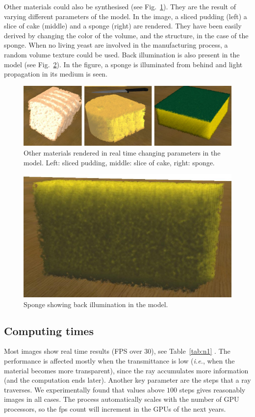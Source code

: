 \documentclass[oneside,a4paper,english,links]{amca}
\begin{document}
Other materials could also be synthesised (see
Fig.~\ref{fg:fig6}). They are the result of varying different
parameters of the model. In the image, a sliced pudding (left) a slice
of cake (middle) and a sponge (right) are rendered. They have been
easily derived by changing the color of the volume, and the structure,
in the case of the sponge. When no living yeast are involved in the
manufacturing process, a random volume texture could be used. Back
illumination is also present in the model (see Fig.~\ref{fg:fig7}). In
the figure, a sponge is illuminated from behind and light propagation
in its medium is seen.

\begin{figure}[htb!]
  \centerline{\includegraphics[scale=0.3]{fig6}}
  \caption{Other materials rendered in real time changing parameters in the model. Left: sliced pudding, middle: slice of cake, right: sponge. }
  \label{fg:fig6}
\end{figure}



\begin{figure}[htb!]
  \centerline{\includegraphics[scale=0.25]{fig7}}
  \caption{Sponge showing back illumination in the model. }
  \label{fg:fig7}
\end{figure}


\subsection{Computing times}
Most images show real time results (FPS over 30), see Table~\ref{tab:n1} . The performance is affected mostly when the transmittance is low ({\em i.e.}, when the material becomes more transparent), since the ray accumulates more information (and the computation ends later). Another key parameter are the steps that a ray traverses. We experimentally found that values above $100$ steps gives reasonably images in all cases. The process automatically scales with the number of GPU processors, so the fps count will increment in the GPUs of the next years.
\end{document}
